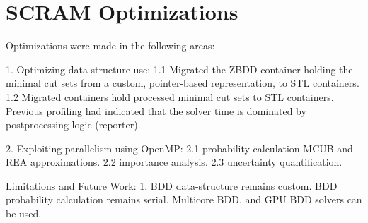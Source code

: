 \section{SCRAM Optimizations}

Optimizations were made in the following areas:

1. Optimizing data structure use:
 1.1 Migrated the ZBDD container holding the minimal cut sets from a custom, pointer-based representation, to STL containers.
 1.2 Migrated containers hold processed minimal cut sets to STL containers. Previous profiling had indicated that the solver time is dominated by postprocessing logic (reporter).
 
2. Exploiting parallelism using OpenMP:
 2.1 probability calculation MCUB and REA approximations.
 2.2 importance analysis.
 2.3 uncertainty quantification.



Limitations and Future Work:
1. BDD data-structure remains custom. BDD probability calculation remains serial. Multicore BDD, and GPU BDD solvers can be used.






